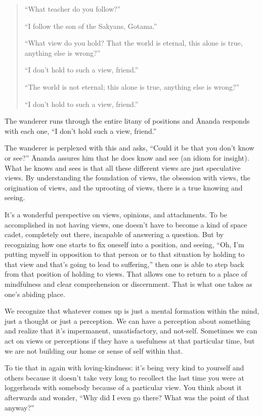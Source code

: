 \begin{quotation}
\hspace*{\the\parindent}“What teacher do you follow?”

“I follow the son of the Sakyans, Gotama.”

“What view do you hold? That the world is eternal, this alone is true,
anything else is wrong?”

“I don’t hold to such a view, friend.”

“The world is not eternal; this alone is true, anything else is wrong?”

“I don’t hold to such a view, friend.”
\end{quotation}

The wanderer runs through the entire litany of positions and Ānanda
responds with each one, “I don’t hold such a view, friend.”

The wanderer is perplexed with this and asks, “Could it be that you
don’t know or see?” Ānanda assures him that he does know and see (an
idiom for insight). What he knows and sees is that all these different
views are just speculative views. By understanding the foundation of
views, the obsession with views, the origination of views, and the
uprooting of views, there is a true knowing and seeing.

It’s a wonderful perspective on views, opinions, and attachments. To be
accomplished in not having views, one doesn’t have to become a kind of
space cadet, completely out there, incapable of answering a question.
But by recognizing how one starts to fix oneself into a position, and
seeing, “Oh, I’m putting myself in opposition to that person or to that
situation by holding to that view and that’s going to lead to
suffering,” then one is able to step back from that position of holding
to views. That allows one to return to a place of mindfulness and clear
comprehension or discernment. That is what one takes as one’s abiding
place.

We recognize that whatever comes up is just a mental formation within
the mind, just a thought or just a perception. We can have a perception
about something and realize that it’s impermanent, unsatisfactory, and
not-self. Sometimes we can act on views or perceptions if they have a
usefulness at that particular time, but we are not building our home or
sense of self within that.

To tie that in again with loving-kindness: it’s being very kind to
yourself and others because it doesn’t take very long to recollect the
last time you were at loggerheads with somebody because of a particular
view. You think about it afterwards and wonder, “Why did I even go
there? What was the point of that anyway?”

